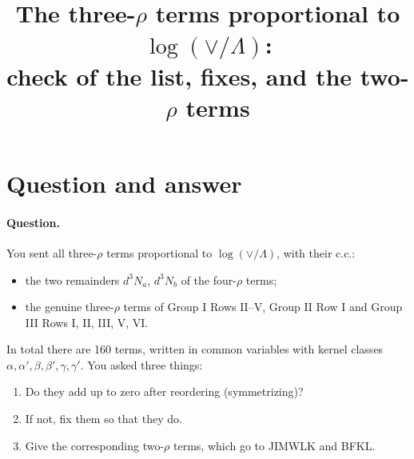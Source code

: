 \documentclass[10pt]{article}
\title{The three-$\rho$ terms proportional to $\log(\vee/\Lambda)$:\\ check of the list, fixes, and the two-$\rho$ terms}
\date{}
\numberwithin{equation}{section}
\begin{document}
\maketitle
\tableofcontents

\section{Question and answer}\label{sec:answer}

\paragraph{Question.} You sent all three-$\rho$ terms proportional to $\log(\vee/\Lambda)$, with their c.c.:
\begin{itemize}
\item the two remainders $d^3N_a$, $d^3N_b$ of the four-$\rho$ terms;
\item the genuine three-$\rho$ terms of Group I Rows II--V, Group II Row I and Group III Rows I, II, III, V, VI.
\end{itemize}
In total there are 160 terms, written in common variables with kernel classes $\alpha,\alpha',\beta,\beta',\gamma,\gamma'$. You asked three things:
\begin{enumerate}
\item Do they add up to zero after reordering (symmetrizing)?
\item If not, fix them so that they do.
\item Give the corresponding two-$\rho$ terms, which go to JIMWLK and BFKL.
\end{enumerate}
\end{document}
